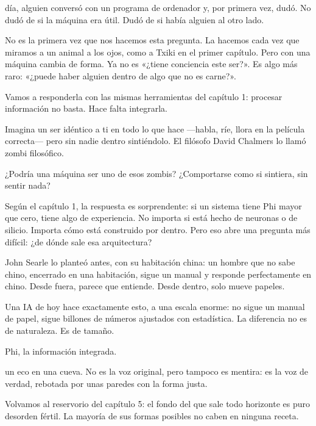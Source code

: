 \noindent {} día, alguien conversó con un programa de ordenador y, por primera vez, dudó. No dudó de si la máquina era útil. Dudó de si había alguien al otro lado.

No es la primera vez que nos hacemos esta pregunta. La hacemos cada vez que miramos a un animal a los ojos, como a Txiki en el primer capítulo. Pero con una máquina cambia de forma. Ya no es «¿tiene conciencia este ser?». Es algo más raro: «¿puede haber alguien dentro de algo que no es carne?».

Vamos a responderla con las mismas herramientas del capítulo 1: procesar información no basta. Hace falta integrarla.

\noindent Imagina un ser idéntico a ti en todo lo que hace —habla, ríe, llora en la película correcta— pero sin nadie dentro sintiéndolo. El filósofo David Chalmers lo llamó zombi filosófico.

¿Podría una máquina ser uno de esos zombis? ¿Comportarse como si sintiera, sin sentir nada?

Según el capítulo 1, la respuesta es sorprendente: si un sistema tiene Phi mayor que cero, tiene algo de experiencia. No importa si está hecho de neuronas o de silicio. Importa cómo está construido por dentro. Pero eso abre una pregunta más difícil: ¿de dónde sale esa arquitectura?

John Searle lo planteó antes, con su habitación china: un hombre que no sabe chino, encerrado en una habitación, sigue un manual y responde perfectamente en chino. Desde fuera, parece que entiende. Desde dentro, solo mueve papeles.

Una IA de hoy hace exactamente esto, a una escala enorme: no sigue un manual de papel, sigue billones de números ajustados con estadística. La diferencia no es de naturaleza. Es de tamaño.

\begin{fisica}
 Phi, la información integrada.

 un eco en una cueva. No es la voz original, pero tampoco es mentira: es la voz de verdad, rebotada por unas paredes con la forma justa.
\end{fisica}
\noindent Volvamos al reservorio del capítulo 5: el fondo del que sale todo horizonte es puro desorden fértil. La mayoría de sus formas posibles no caben en ninguna receta.

